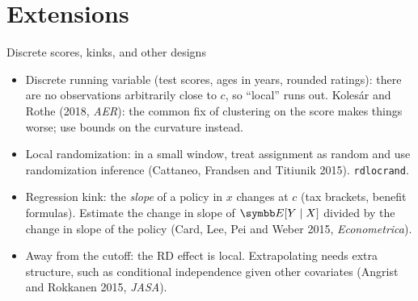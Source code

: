 \documentclass[aspectratio=169,11pt]{beamer}
\begin{document}
\section{Extensions}

\begin{frame}{Discrete scores, kinks, and other designs}
\begin{itemize}
	\item \alert{Discrete running variable} (test scores, ages in years, rounded ratings): there are no
	observations arbitrarily close to $c$, so ``local'' runs out. Kolesár and Rothe (2018, \emph{AER}): the
	common fix of clustering on the score makes things worse; use bounds on the curvature instead.
	\medskip
	\item \alert{Local randomization}: in a small window, treat assignment as random and use randomization
	inference (Cattaneo, Frandsen and Titiunik 2015). \texttt{rdlocrand}.
	\medskip
	\item \alert{Regression kink}: the \emph{slope} of a policy in $x$ changes at $c$ (tax brackets, benefit
	formulas). Estimate the change in slope of $\E[Y \mid X]$ divided by the change in slope of the policy
	(Card, Lee, Pei and Weber 2015, \emph{Econometrica}).
	\medskip
	\item \alert{Away from the cutoff}: the RD effect is local. Extrapolating needs extra structure, such as
	conditional independence given other covariates (Angrist and Rokkanen 2015, \emph{JASA}).
\end{itemize}
\end{frame}
\end{document}
